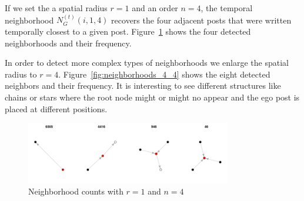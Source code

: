 \documentclass[9pt,technote]{IEEEtran}
\begin{document}
If we set the a spatial radius $r=1$ and an order $n=4$, the temporal neighborhood $N_{G}^{(t)}(i, 1, 4)$ recovers the four adjacent posts that were written temporally closest to a given post. Figure~\ref{fig:neighborhoods_1_4} shows the four detected neighborhoods and their frequency.

In order to detect more complex types of neighborhoods we enlarge the spatial radius to $r=4$. Figure~\ref{fig:neighborhoods_4_4} shows the eight detected neighbors and their frequency. It is interesting to see different structures like chains or stars where the root node might or might no appear and the ego post is placed at different positions.

\begin{figure}
	\centering
	\includegraphics[width=0.8\textwidth]{neighborhoods_1_4}
	\caption{Neighborhood counts with $r=1$ and $n=4$}
	\label{fig:neighborhoods_1_4}
\end{figure}
\end{document}
